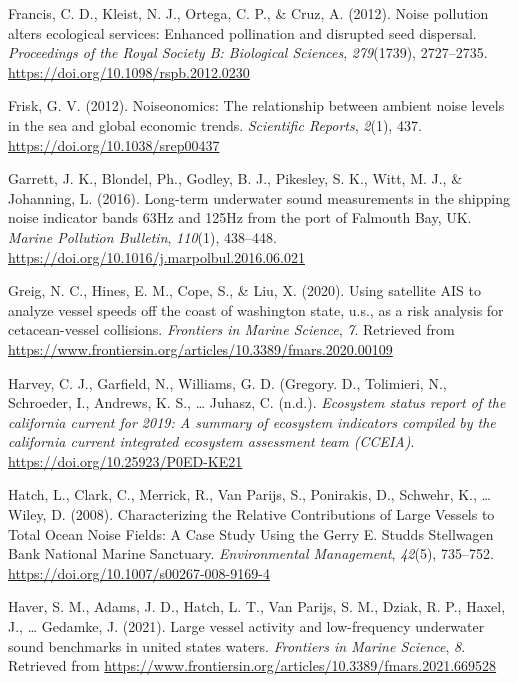 \documentclass[
]{article}
\newlength{\cslhangindent}
\newlength{\cslentryspacingunit} %
\newenvironment{CSLReferences}[2] %
 {%
  \setlength{\parindent}{0pt}
  \ifodd #1
  \let\oldpar\par
  \def\par{\hangindent=\cslhangindent\oldpar}
  \fi
  \setlength{\parskip}{#2\cslentryspacingunit}
 }%
 {}
\begin{document}
\begin{CSLReferences}{1}{0}
\leavevmode{}%
Francis, C. D., Kleist, N. J., Ortega, C. P., \& Cruz, A. (2012). Noise
pollution alters ecological services: Enhanced pollination and disrupted
seed dispersal. \emph{Proceedings of the Royal Society B: Biological
Sciences}, \emph{279}(1739), 2727--2735.
\url{https://doi.org/10.1098/rspb.2012.0230}

\leavevmode{}%
Frisk, G. V. (2012). Noiseonomics: The relationship between ambient
noise levels in the sea and global economic trends. \emph{Scientific
Reports}, \emph{2}(1), 437. \url{https://doi.org/10.1038/srep00437}

\leavevmode{}%
Garrett, J. K., Blondel, Ph., Godley, B. J., Pikesley, S. K., Witt, M.
J., \& Johanning, L. (2016). Long-term underwater sound measurements in
the shipping noise indicator bands 63Hz and 125Hz from the port of
Falmouth Bay, UK. \emph{Marine Pollution Bulletin}, \emph{110}(1),
438--448. \url{https://doi.org/10.1016/j.marpolbul.2016.06.021}

\leavevmode{}%
Greig, N. C., Hines, E. M., Cope, S., \& Liu, X. (2020). Using satellite
AIS to analyze vessel speeds off the coast of washington state, u.s., as
a risk analysis for cetacean-vessel collisions. \emph{Frontiers in
Marine Science}, \emph{7}. Retrieved from
\url{https://www.frontiersin.org/articles/10.3389/fmars.2020.00109}

\leavevmode{}%
Harvey, C. J., Garfield, N., Williams, G. D. (Gregory. D., Tolimieri,
N., Schroeder, I., Andrews, K. S., \ldots{} Juhasz, C. (n.d.).
\emph{Ecosystem status report of the california current for 2019: A
summary of ecosystem indicators compiled by the california current
integrated ecosystem assessment team (CCEIA)}.
\url{https://doi.org/10.25923/P0ED-KE21}

\leavevmode{}%
Hatch, L., Clark, C., Merrick, R., Van Parijs, S., Ponirakis, D.,
Schwehr, K., \ldots{} Wiley, D. (2008). Characterizing the Relative
Contributions of Large Vessels to Total Ocean Noise Fields: A Case Study
Using the Gerry E. Studds Stellwagen Bank National Marine Sanctuary.
\emph{Environmental Management}, \emph{42}(5), 735--752.
\url{https://doi.org/10.1007/s00267-008-9169-4}

\leavevmode{}%
Haver, S. M., Adams, J. D., Hatch, L. T., Van Parijs, S. M., Dziak, R.
P., Haxel, J., \ldots{} Gedamke, J. (2021). Large vessel activity and
low-frequency underwater sound benchmarks in united states waters.
\emph{Frontiers in Marine Science}, \emph{8}. Retrieved from
\url{https://www.frontiersin.org/articles/10.3389/fmars.2021.669528}


\end{CSLReferences}
\end{document}
